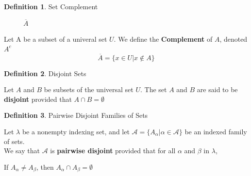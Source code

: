 \documentclass{book}
\theoremstyle{definition}
\newtheorem{definition}{Definition}[section]
\theoremstyle{remark}
\begin{document}
\begin{definition}
Set Complement \\


\begin{figure}[H]
    \centering
        \def \setA{ (0,0) circle (1cm) }

        \def \myrectangle{ (-1.5, -1.5) rectangle (1.5, 1.5) }
            \begin{center}
            \end{center}
    \caption{$\overline{A}$}
    \label{fig:Acomp}
\end{figure}


\begin{tcolorbox}
    Let A be a subset of a univeral set $U$. We define the \textbf{Complement} of $A$, denoted $A^c$
    \begin{equation*}
            \overline{A} = \{x \in U | x \notin A \}
        \end{equation*}
\end{tcolorbox}
\end{definition}


\begin{definition}
Disjoint Sets

\begin{tcolorbox}
    Let $A$ and $B$ be subsets of the universal set $U$. The set $A$ and $B$ are said to be \textbf{disjoint} provided that $A \cap B = \emptyset$
\end{tcolorbox}
\end{definition}


\begin{definition}
Pairwise Disjoint Families of Sets

\begin{tcolorbox}
    Let $\lambda$ be a nonempty indexing set, and let $\mathcal{A} = \{ A_{\alpha} | \alpha \in \mathcal{A} \}$ be an indexed family of sets. \\
    We say that $\mathcal{A}$ is \textbf{pairwise disjoint} provided that for all $\alpha$ and $\beta$ in $\lambda$,
        \begin{center}
            If $A_{\alpha} \neq A_{\beta}$, then $A_{\alpha} \cap A_{\beta} = \emptyset$
        \end{center}
\end{tcolorbox}
\end{definition}
\end{document}
